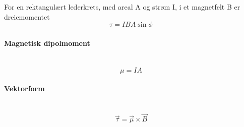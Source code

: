 For en rektangulært lederkrets, med areal A og strøm I,
i et magnetfelt B er dreiemomentet
$$\tau = IBA\sin{\phi}$$



\paragraph{Magnetisk dipolmoment} \hfill \\
$$\mu = IA$$



\paragraph{Vektorform} \hfill \\
$$\vec{\tau} = \vec{\mu} \times \vec{B}$$
